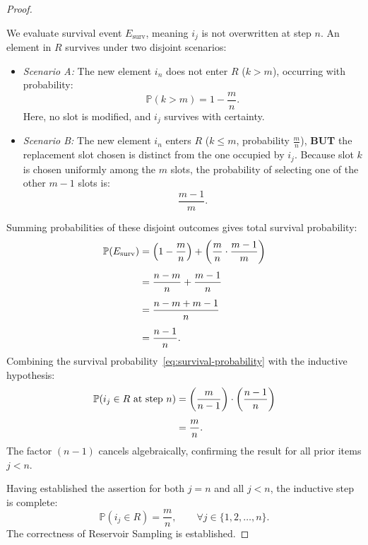 \begin{proof}
\begin{itemize}
  We evaluate survival event $E_{\text{surv}}$, meaning $i_j$ is not overwritten at step $n$. An element in $R$ survives under two disjoint scenarios:
  \begin{itemize}
    \item \emph{Scenario A:} The new element $i_n$ does not enter $R$ ($k > m$), occurring with probability:
    \begin{equation}
      \mathbb{P}(k > m) = 1 - \frac{m}{n}.
    \end{equation}
    Here, no slot is modified, and $i_j$ survives with certainty.
    \item \emph{Scenario B:} The new element $i_n$ enters $R$ ($k \le m$, probability $\frac{m}{n}$), \textbf{BUT} the replacement slot chosen is distinct from the one occupied by $i_j$. Because slot $k$ is chosen uniformly among the $m$ slots, the probability of selecting one of the other $m - 1$ slots is:
    \begin{equation}
      \frac{m - 1}{m}.
    \end{equation}
  \end{itemize}
  Summing probabilities of these disjoint outcomes gives total survival probability:
  \begin{align}
    \mathbb{P}(E_{\text{surv}}) &= \left(1 - \frac{m}{n}\right) + \left(\frac{m}{n} \cdot \frac{m - 1}{m}\right) \notag\\[1ex]
    &= \frac{n - m}{n} + \frac{m - 1}{n} \notag\\[1ex]
    &= \frac{n - m + m - 1}{n} \notag\\[1ex]
    &= \frac{n - 1}{n}.
    \label{eq:survival-probability}
  \end{align}
  Combining the survival probability~\eqref{eq:survival-probability} with the inductive hypothesis:
  \begin{align}
    \mathbb{P}(i_j \in R \text{ at step } n) &= \left(\frac{m}{n - 1}\right) \cdot \left(\frac{n - 1}{n}\right) \notag\\[1ex]
    &= \frac{m}{n}.
  \end{align}
  The factor $(n - 1)$ cancels algebraically, confirming the result for all prior items $j < n$.
\end{itemize}
Having established the assertion for both $j = n$ and all $j < n$, the inductive step is complete:
\begin{equation}
  \mathbb{P}(i_j \in R) = \frac{m}{n}, \qquad \forall j \in \{1, 2, \dots, n\}.
\end{equation}
The correctness of Reservoir Sampling is established.
\end{proof}

